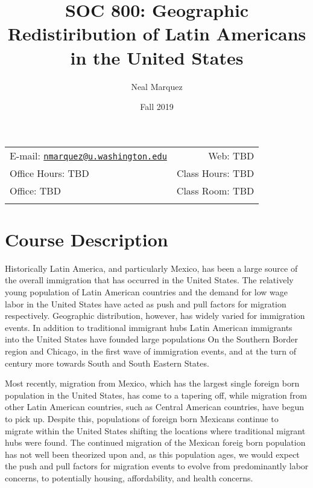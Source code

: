\documentclass[11pt,]{article}
\title{SOC 800: Geographic Redistiribution of Latin Americans in the United
States}
\author{Neal Marquez}
\date{Fall 2019}
\begin{document}
  

		\maketitle
		
	
		\thispagestyle{firststyle}



	\noindent \begin{tabular*}{\textwidth}{ @{\extracolsep{\fill}} lr @{\extracolsep{\fill}}}


E-mail: \texttt{\href{mailto:nmarquez@u.washington.edu}{\nolinkurl{nmarquez@u.washington.edu}}} & Web: TBD\\
Office Hours: TBD  &  Class Hours: TBD\\
Office: TBD  & Class Room: TBD\\
	&  \\
	\hline
	\end{tabular*}
	
\vspace{2mm}
	


\hypertarget{course-description}{%
\section{Course Description}\label{course-description}}

Historically Latin America, and particularly Mexico, has been a large
source of the overall immigration that has occurred in the United
States. The relatively young population of Latin American countries and
the demand for low wage labor in the United States have acted as push
and pull factors for migration respectively. Geographic distribution,
however, has widely varied for immigration events. In addition to
traditional immigrant hubs Latin American immigrants into the United
States have founded large populations On the Southern Border region and
Chicago, in the first wave of immigration events, and at the turn of
century more towards South and South Eastern States.

Most recently, migration from Mexico, which has the largest single
foreign born population in the United States, has come to a tapering
off, while migration from other Latin American countries, such as
Central American countries, have begun to pick up. Despite this,
populations of foreign born Mexicans continue to migrate within the
United States shifting the locations where traditional migrant hubs were
found. The continued migration of the Mexican foreig born population has
not well been theorized upon and, as this population ages, we would
expect the push and pull factors for migration events to evolve from
predominantly labor concerns, to potentially housing, affordability, and
health concerns.
\end{document}
